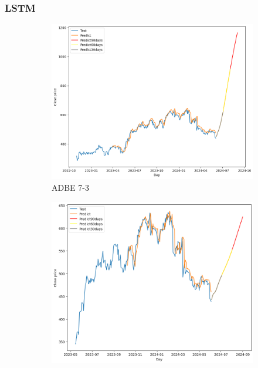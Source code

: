 \documentclass{ieeeojies}
\begin{document}
\subsubsection{LSTM}
\begin{figure}[H]
    \centering
    \begin{subfigure}[h]{0.33\linewidth}
        \centering
        \includegraphics[width=\linewidth]{LSTM Plot/ADBE_LSTM_7_3.png}
        \caption{ADBE 7-3}
        \label{fig:adbe-7-3}
    \end{subfigure}%
    \hfill
    \begin{subfigure}[h]{0.33\linewidth}
        \centering
        \includegraphics[width=\linewidth]{LSTM Plot/ADBE_LSTM_8_2.png}

\end{subfigure}
\end{figure}
\end{document}
